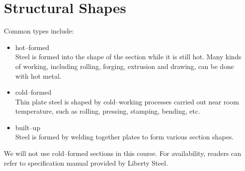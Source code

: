\section{Structural Shapes}
Common types include:
\begin{itemize}
\item hot--formed\\Steel is formed into the shape of the section while it is still hot. Many kinds of working, including rolling, forging, extrusion and drawing, can be done with hot metal.
\item cold--formed\\Thin plate steel is shaped by cold--working processes carried out near room temperature, such as rolling, pressing, stamping, bending, etc.
\item built--up\\Steel is formed by welding together plates to form various section shapes.
\end{itemize}
We will not use cold--formed sections in this course. For availability, readers can refer to specification manual provided by Liberty Steel.
